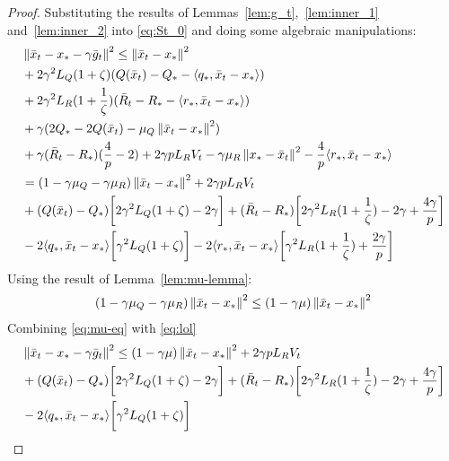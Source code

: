 \begin{proof} Substituting the results of Lemmas~\ref{lem:g_t},~\ref{lem:inner_1} and~\ref{lem:inner_2} into \eqref{eq:St_0} and doing some algebraic manipulations:
    \begin{align}
        \begin{split}
            &\left\|\bar{x}_t - x_* - \gamma \bar{g}_t\right\|^2 \leq \left\|\bar{x}_t - x_*\right\|^2 \\
            &+ 2\gamma^2 L_Q (1 + \zeta) (Q(\bar{x}_t) - Q_* - \langle q_*, \bar{x}_t - x_*\rangle) \\
            &+ 2\gamma^2 L_R (1 + \frac{1}{\zeta}) (\bar{R}_t - R_* - \langle r_*, \bar{x}_t - x_*\rangle) \\
            &+ \gamma ( 2 Q_* - 2 Q(\bar{x}_t) - \mu_Q \left\|\bar{x}_t - x_*\right\|^2 ) \\
            &+ \gamma(\bar{R}_t - R_*)(\frac{4}{p} - 2) + 2 \gamma p L_R V_t - \gamma \mu_R \left\|x_* - \bar{x}_t\right\|^2 - \frac{4}{p}\langle r_*, \bar{x}_t - x_*\rangle\\
            &= (1 - \gamma \mu_Q - \gamma \mu_R)\left\|\bar{x}_t - x_*\right\|^2 + 2 \gamma p L_R V_t \\
            &+ (Q(\bar{x}_t) - Q_*)\biggr[ 2\gamma^2 L_Q (1+\zeta) - 2\gamma \biggr]
            + (\bar{R}_t - R_*)\biggr[ 2\gamma^2 L_R (1+\frac{1}{\zeta}) - 2\gamma + \frac{4\gamma}{p} \biggr] \\
            &- 2\langle q_*, \bar{x}_t - x_*\rangle\biggr[ \gamma^2 L_Q(1+\zeta) \biggr]
            - 2\langle r_*, \bar{x}_t - x_*\rangle\biggr[ \gamma^2 L_R(1+\frac{1}{\zeta}) + \frac{2\gamma}{p} \biggr] \label{eq:lol}
        \end{split}
    \end{align}
    Using the result of Lemma~\ref{lem:mu-lemma}:
    \begin{align}
        (1 - \gamma \mu_Q - \gamma \mu_R)\left\|\bar{x}_t - x_*\right\|^2 \leq (1 - \gamma \mu)\left\|\bar{x}_t - x_*\right\|^2 \label{eq:mu-eq}
    \end{align}
    Combining \eqref{eq:mu-eq} with \eqref{eq:lol}
    \begin{align}
        \begin{split}
             &\norm{\bar{x}_t - x_* - \gamma \bar{g}_t}^2 \leq 
            (1 - \gamma \mu)\norm{\bar{x}_t - x_*}^2 + 2 \gamma p L_R V_t \\
            &+ (Q(\bar{x}_t) - Q_*)\coef {2\gamma^2 L_Q (1+\zeta) - 2\gamma}
            + (\bar{R}_t - R_*)\coef{2\gamma^2 L_R (1+\frac{1}{\zeta}) - 2\gamma + \frac{4\gamma}{p}} \\
            &- 2\inner{q_*}{\bar{x}_t - x_*}\coef{\gamma^2 L_Q(1+\zeta)}

\end{split}
\end{align}
\end{proof}
